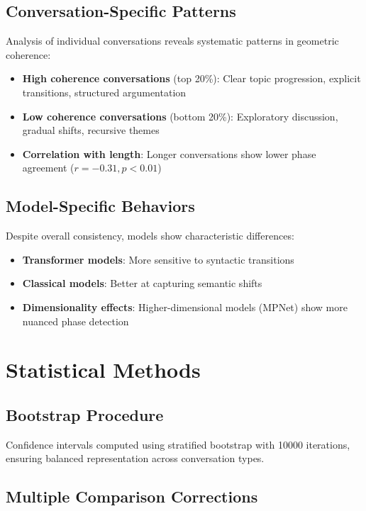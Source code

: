 \documentclass[11pt,letterpaper]{article}
\newcommand{\bootstrapIterations}{10000}
\begin{document}
\subsection{Conversation-Specific Patterns}

Analysis of individual conversations reveals systematic patterns in geometric coherence:

\begin{itemize}
\item \textbf{High coherence conversations} (top 20\%): Clear topic progression, explicit transitions, structured argumentation
\item \textbf{Low coherence conversations} (bottom 20\%): Exploratory discussion, gradual shifts, recursive themes
\item \textbf{Correlation with length}: Longer conversations show lower phase agreement ($r = -0.31, p < 0.01$)
\end{itemize}

\subsection{Model-Specific Behaviors}

Despite overall consistency, models show characteristic differences:

\begin{itemize}
\item \textbf{Transformer models}: More sensitive to syntactic transitions
\item \textbf{Classical models}: Better at capturing semantic shifts
\item \textbf{Dimensionality effects}: Higher-dimensional models (MPNet) show more nuanced phase detection
\end{itemize}

\section{Statistical Methods}

\subsection{Bootstrap Procedure}

Confidence intervals computed using stratified bootstrap with \bootstrapIterations{} iterations, ensuring balanced representation across conversation types.

\subsection{Multiple Comparison Corrections}
\end{document}

